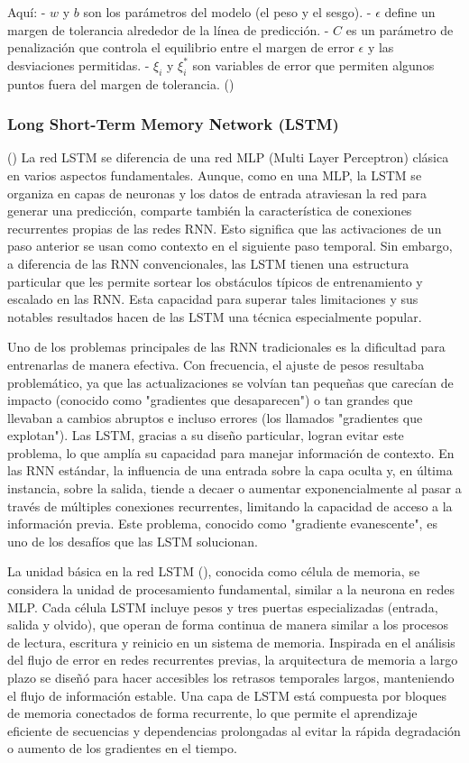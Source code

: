 Aquí:
- \(w\) y \(b\) son los parámetros del modelo (el peso y el sesgo).
- \(\epsilon\) define un margen de tolerancia alrededor de la línea de predicción.
- \(C\) es un parámetro de penalización que controla el equilibrio entre el margen de error \(\epsilon\) y las desviaciones permitidas.
- \(\xi_i\) y \(\xi_i^*\) son variables de error que permiten algunos puntos fuera del margen de tolerancia. (\cite{wang2005support})

\subsubsection{Long Short-Term Memory Network (LSTM)}
(\cite{brownlee2017long}) La red LSTM se diferencia de una red MLP (Multi Layer Perceptron) clásica en varios aspectos fundamentales. Aunque, como en una MLP, la LSTM se organiza en capas de neuronas y los datos de entrada atraviesan la red para generar una predicción, comparte también la característica de conexiones recurrentes propias de las redes RNN. Esto significa que las activaciones de un paso anterior se usan como contexto en el siguiente paso temporal. Sin embargo, a diferencia de las RNN convencionales, las LSTM tienen una estructura particular que les permite sortear los obstáculos típicos de entrenamiento y escalado en las RNN. Esta capacidad para superar tales limitaciones y sus notables resultados hacen de las LSTM una técnica especialmente popular.

Uno de los problemas principales de las RNN tradicionales es la dificultad para entrenarlas de manera efectiva. Con frecuencia, el ajuste de pesos resultaba problemático, ya que las actualizaciones se volvían tan pequeñas que carecían de impacto (conocido como "gradientes que desaparecen") o tan grandes que llevaban a cambios abruptos e incluso errores (los llamados "gradientes que explotan"). Las LSTM, gracias a su diseño particular, logran evitar este problema, lo que amplía su capacidad para manejar información de contexto. En las RNN estándar, la influencia de una entrada sobre la capa oculta y, en última instancia, sobre la salida, tiende a decaer o aumentar exponencialmente al pasar a través de múltiples conexiones recurrentes, limitando la capacidad de acceso a la información previa. Este problema, conocido como "gradiente evanescente", es uno de los desafíos que las LSTM solucionan.

La unidad básica en la red LSTM (\cite{gupta2022advanced}), conocida como célula de memoria, se considera la unidad de procesamiento fundamental, similar a la neurona en redes MLP. Cada célula LSTM incluye pesos y tres puertas especializadas (entrada, salida y olvido), que operan de forma continua de manera similar a los procesos de lectura, escritura y reinicio en un sistema de memoria. Inspirada en el análisis del flujo de error en redes recurrentes previas, la arquitectura de memoria a largo plazo se diseñó para hacer accesibles los retrasos temporales largos, manteniendo el flujo de información estable. Una capa de LSTM está compuesta por bloques de memoria conectados de forma recurrente, lo que permite el aprendizaje eficiente de secuencias y dependencias prolongadas al evitar la rápida degradación o aumento de los gradientes en el tiempo.

